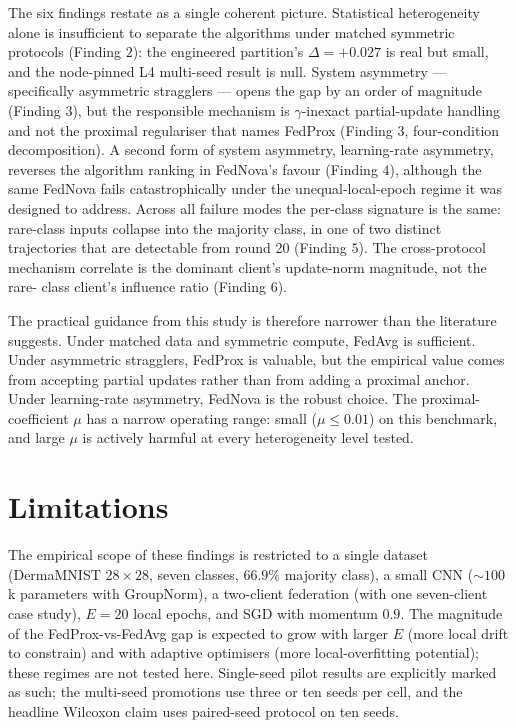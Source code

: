 \documentclass[11pt,a4paper]{report}
\begin{document}
The six findings restate as a single coherent picture. Statistical
heterogeneity alone is insufficient to separate the algorithms under
matched symmetric protocols (Finding $2$): the engineered partition's
$\Delta = +0.027$ is real but small, and the node-pinned L4 multi-seed
result is null. System asymmetry --- specifically asymmetric stragglers ---
opens the gap by an order of magnitude (Finding $3$), but the responsible
mechanism is $\gamma$-inexact partial-update handling and not the proximal
regulariser that names FedProx (Finding $3$, four-condition
decomposition). A second form of system asymmetry, learning-rate
asymmetry, reverses the algorithm ranking in FedNova's favour (Finding
$4$), although the same FedNova fails catastrophically under the
unequal-local-epoch regime it was designed to address. Across all
failure modes the per-class signature is the same: rare-class inputs
collapse into the majority class, in one of two distinct trajectories that
are detectable from round 20 (Finding $5$). The cross-protocol mechanism
correlate is the dominant client's update-norm magnitude, not the rare-
class client's influence ratio (Finding $6$).

The practical guidance from this study is therefore narrower than the
literature suggests. Under matched data and symmetric compute, FedAvg is
sufficient. Under asymmetric stragglers, FedProx is valuable, but the
empirical value comes from accepting partial updates rather than from
adding a proximal anchor. Under learning-rate asymmetry, FedNova is the
robust choice. The proximal-coefficient $\mu$ has a narrow operating
range: small ($\mu \leq 0.01$) on this benchmark, and large $\mu$ is
actively harmful at every heterogeneity level tested.

\section{Limitations}
\label{sec:cond-limitations}

The empirical scope of these findings is restricted to a single dataset
(DermaMNIST $28 \times 28$, seven classes, $66.9\%$ majority class), a
small CNN ($\sim 100$k parameters with GroupNorm), a two-client federation
(with one seven-client case study), $E = 20$ local epochs, and SGD with
momentum $0.9$. The magnitude of the FedProx-vs-FedAvg gap is expected to
grow with larger $E$ (more local drift to constrain) and with adaptive
optimisers (more local-overfitting potential); these regimes are not
tested here. Single-seed pilot results are explicitly marked as such; the
multi-seed promotions use three or ten seeds per cell, and the headline
Wilcoxon claim uses paired-seed protocol on ten seeds.



\end{document}
